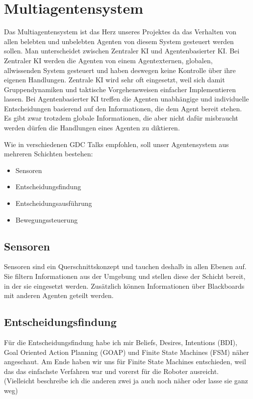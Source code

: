 \section{Multiagentensystem}

Das Multiagentensystem ist das Herz unseres Projektes da das Verhalten von allen belebten und unbelebten Agenten von diesem System gesteuert werden sollen. Man unterscheidet zwischen Zentraler KI und Agentenbasierter KI. Bei Zentraler KI werden die Agenten von einem Agentexternen, globalen, allwissenden System gesteuert und haben deswegen keine Kontrolle über ihre eigenen Handlungen. Zentrale KI wird sehr oft eingesetzt, weil sich damit Gruppendynamiken und taktische Vorgehensweisen einfacher Implementieren lassen. Bei Agentenbasierter KI treffen die Agenten unabhängige und individuelle Entscheidungen basierend auf den Informationen, die dem Agent bereit stehen. Es gibt zwar trotzdem globale Informationen, die aber nicht dafür misbraucht werden dürfen die Handlungen eines Agenten zu diktieren.

Wie in verschiedenen GDC Talks empfohlen, soll unser Agentensystem aus mehreren Schichten bestehen:

\begin{itemize}
\item Sensoren
\item Entscheidungsfindung
\item Entscheidungsausführung
\item Bewegungssteuerung
\end{itemize}

\subsection{Sensoren}

Sensoren sind ein Querschnittskonzept und tauchen deshalb in allen Ebenen auf. Sie filtern Informationen aus der Umgebung und stellen diese der Schicht bereit, in der sie eingesetzt werden. Zusätzlich können Informationen über Blackboards mit anderen Agenten geteilt werden.

\subsection{Entscheidungsfindung}

Für die Entscheidungsfindung habe ich mir Beliefs, Desires, Intentions (BDI), Goal Oriented Action Planning (GOAP) und Finite State Machines (FSM) näher angeschaut. Am Ende haben wir uns für Finite State Machines entschieden, weil das das einfachste Verfahren war und vorerst für die Roboter ausreicht. (Vielleicht beschreibe ich die anderen zwei ja auch noch näher oder lasse sie ganz weg)

